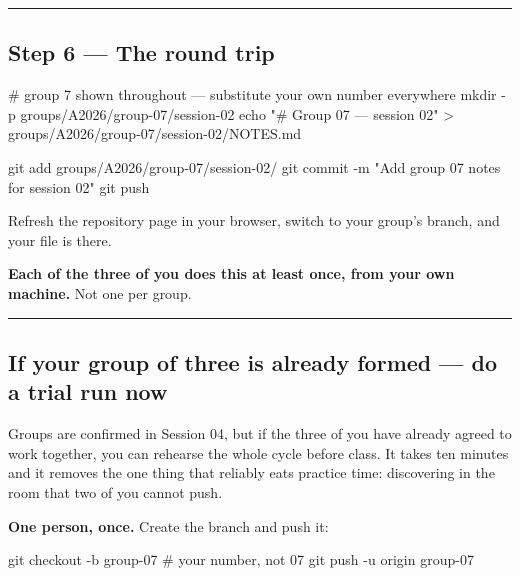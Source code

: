\documentclass[
  letterpaper,
  10pt,
  twoside,
  openright,
  numbers=noenddot,
  chapterprefix=true]{scrbook}
\newenvironment{Shaded}{}{}
\newcommand{\AttributeTok}[1]{\textcolor[rgb]{0.84,0.23,0.29}{#1}}
\newcommand{\BuiltInTok}[1]{\textcolor[rgb]{0.84,0.23,0.29}{#1}}
\newcommand{\CommentTok}[1]{\textcolor[rgb]{0.42,0.45,0.49}{#1}}
\newcommand{\FunctionTok}[1]{\textcolor[rgb]{0.44,0.26,0.76}{#1}}
\newcommand{\NormalTok}[1]{\textcolor[rgb]{0.14,0.16,0.18}{#1}}
\newcommand{\OperatorTok}[1]{\textcolor[rgb]{0.14,0.16,0.18}{#1}}
\newcommand{\StringTok}[1]{\textcolor[rgb]{0.01,0.18,0.38}{#1}}
\begin{document}
\begin{center}\rule{0.5\linewidth}{0.5pt}\end{center}

\subsection{Step 6 --- The round trip}\label{step-6-the-round-trip}

\begin{Shaded}
\begin{Highlighting}[]
\CommentTok{\# group 7 shown throughout — substitute your own number everywhere}
\FunctionTok{mkdir} \AttributeTok{{-}p}\NormalTok{ groups/A2026/group{-}07/session{-}02}
\BuiltInTok{echo} \StringTok{"\# Group 07 — session 02"} \OperatorTok{\textgreater{}}\NormalTok{ groups/A2026/group{-}07/session{-}02/NOTES.md}

\FunctionTok{git}\NormalTok{ add groups/A2026/group{-}07/session{-}02/}
\FunctionTok{git}\NormalTok{ commit }\AttributeTok{{-}m} \StringTok{"Add group 07 notes for session 02"}
\FunctionTok{git}\NormalTok{ push}
\end{Highlighting}
\end{Shaded}

Refresh the repository page in your browser, switch to your group's
branch, and your file is there.

\textbf{Each of the three of you does this at least once, from your own
machine.} Not one per group.

\begin{center}\rule{0.5\linewidth}{0.5pt}\end{center}

\subsection{If your group of three is already formed --- do a trial run
now}\label{if-your-group-of-three-is-already-formed-do-a-trial-run-now}

Groups are confirmed in Session 04, but if the three of you have already
agreed to work together, you can rehearse the whole cycle before class.
It takes ten minutes and it removes the one thing that reliably eats
practice time: discovering in the room that two of you cannot push.

\textbf{One person, once.} Create the branch and push it:

\begin{Shaded}
\begin{Highlighting}[]
\FunctionTok{git}\NormalTok{ checkout }\AttributeTok{{-}b}\NormalTok{ group{-}07              }\CommentTok{\# your number, not 07}
\FunctionTok{git}\NormalTok{ push }\AttributeTok{{-}u}\NormalTok{ origin group{-}07}
\end{Highlighting}
\end{Shaded}
\end{document}

